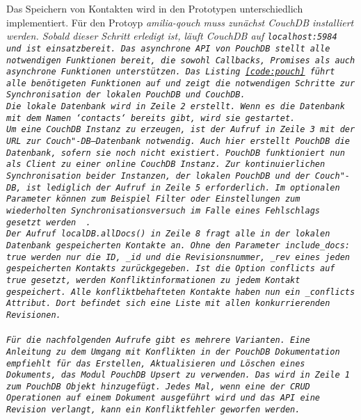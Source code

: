 Das Speichern von Kontakten wird in den Prototypen unterschiedlich implementiert.
%
%
Für den Protoyp \it{amilia-qouch} muss zunächst CouchDB installiert werden.
Sobald dieser Schritt erledigt ist, läuft CouchDB auf \tt{localhost:5984} und ist einsatzbereit.
Das asynchrone \gls{API} von PouchDB stellt alle notwendigen Funktionen bereit, die sowohl Callbacks, Promises als auch asynchrone Funktionen unterstützen. 
Das Listing \ref{code:pouch} führt alle benötigeten Funktionen auf und zeigt die notwendigen Schritte zur Synchronisation der lokalen PouchDB und CouchDB.\\
Die lokale Datenbank wird in Zeile 2 erstellt. Wenn es die Datenbank mit dem Namen `contacts` bereits gibt, wird sie gestartet.\\
%
Um eine CouchDB Instanz zu erzeugen, ist der Aufruf in Zeile 3 mit der URL zur Couch"-DB--Datenbank notwendig. Auch hier erstellt PouchDB die Datenbank, sofern sie noch nicht existiert. PouchDB funktioniert nun als Client zu einer online CouchDB Instanz.
Zur kontinuierlichen Synchronisation beider Instanzen, der lokalen PouchDB und der Couch"-DB, ist lediglich der Aufruf in Zeile 5 erforderlich. Im optionalen Parameter können zum Beispiel Filter oder Einstellungen zum wiederholten Synchronisationsversuch im Falle eines Fehlschlags gesetzt werden ~\cite{pouch_options}.\\
Der Aufruf \tt{localDB.allDocs()} in Zeile 8 fragt alle in der lokalen Datenbank gespeicherten Kontakte an.
Ohne den Parameter \tt{include\_docs: true} werden nur die ID, \tt{\_id} und die Revisionsnummer, \tt{\_rev} eines jeden gespeicherten Kontakts zurückgegeben.
Ist die Option \tt{conflicts} auf \tt{true} gesetzt, werden Konfliktinformationen zu jedem Kontakt gespeichert. Alle konfliktbehafteten Kontakte haben nun ein \tt{\_conflicts} Attribut. Dort befindet sich eine Liste mit allen konkurrierenden Revisionen.\\\\
%
Für die nachfolgenden Aufrufe gibt es mehrere Varianten. Eine Anleitung zu dem Umgang mit Konflikten in der PouchDB Dokumentation empfiehlt für das Erstellen, Aktualisieren und Löschen eines Dokuments, das Modul PouchDB Upsert zu verwenden. Das wird in Zeile 1 zum PouchDB Objekt hinzugefügt.
Jedes Mal, wenn eine der \gls{CRUD} Operationen auf einem Dokument ausgeführt wird und das \gls{API} eine Revision verlangt, kann ein Konfliktfehler geworfen werden.
